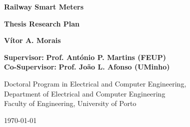 \vspace{25mm}
\begin{addmargin}[2cm]{1mm}
	\begin{center}
		
		\begin{LARGE}
			\textbf{\color{FEUP} Railway Smart Meters\\}
		\end{LARGE}
		
		\vspace{5mm}
		
		\textbf{Thesis Research Plan\\}
		
		\vspace{30mm}
		
		\textbf{\Large Vítor A. Morais} \\
		
		\vspace{5mm}
		
		\textbf{Supervisor:} \textbf{Prof. António P. Martins (FEUP)} \\
		\textbf{Co-Supervisor:} \textbf{Prof. João L. Afonso (UMinho)}
		
		\vfill %
		
		\small{Doctoral Program in Electrical and Computer Engineering,}\\
		\small{Department of Electrical and Computer Engineering}\\
		\small{Faculty of Engineering, University of Porto\\}
		\small{\today \par} %
		
	\end{center}
	
\end{addmargin}


\clearpage %

%
\cleardoublepage
{}
\tableofcontents
\cleardoublepage
{}
\listoffigures
\cleardoublepage
{}
\listoftables

